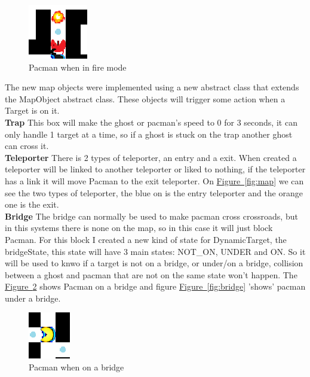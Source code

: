 \documentclass[]{article}
\newcommand{\wordlink}[2]{\hyperref[#2]{#1~\ref{#2}}}
\begin{document}
\begin{figure}[h!]
\centering
\includegraphics[width=0.2\linewidth]{fire.png}
\caption{Pacman when in fire mode}
\label{fig:fire}
\end{figure}

The new map objects were implemented using a new abstract class that extends the MapObject abstract class. These objects will trigger some action when a Target is on it. \\

\textbf{Trap} This box will make the ghost or pacman's  speed to 0 for 3 seconds, it can only handle 1 target at a time, so if a ghost is stuck on the trap another ghost can cross it. \\

\textbf{Teleporter} There is 2 types of teleporter, an entry and a exit. When created a teleporter will be linked to another teleporter or liked to nothing, if the teleporter has a link it will move Pacman to the exit teleporter. On \wordlink{Figure}{fig:map} we can see the two types of teleporter, the blue on is the entry teleporter and the orange one is the exit. \\

\textbf{Bridge} The bridge can normally be used to make pacman cross crossroads, but in this systems there is none on the map, so in this case it will just block Pacman. For this block I created a new kind of state for DynamicTarget, the bridgeState, this state will have 3 main states: NOT\_ON, UNDER and ON. So it will be used to knwo if a target is not on a bridge, or under/on a bridge, collision between a ghost and pacman that are not on the same state won't happen. The  \wordlink{Figure}{fig:bridgeU} shows Pacman on a bridge and figure \wordlink{Figure}{fig:bridge} 'shows' pacman under a bridge.\\

\begin{figure}[h!]
\centering
\includegraphics[width=0.2\linewidth]{bridge4.png}
\caption{Pacman when on a bridge}
\label{fig:bridgeU}
\end{figure}
\end{document}
